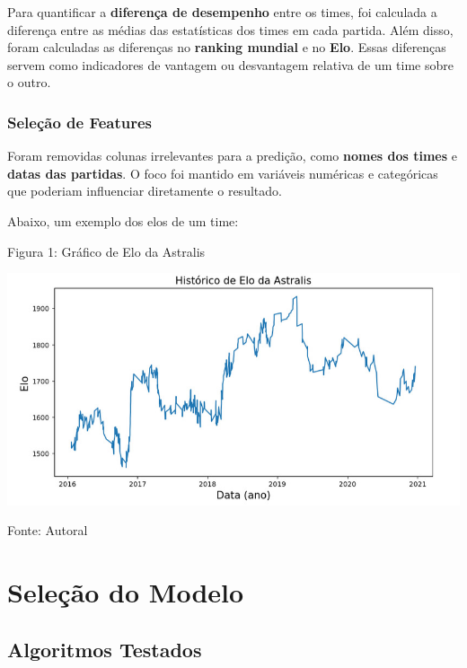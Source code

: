 \documentclass[a4paper,times,12pt]{article}
\begin{document}
\hspace{+15pt}
Para quantificar a \textbf{diferença de desempenho} entre os times, foi calculada a diferença entre as médias das estatísticas dos times em cada partida. Além disso, foram calculadas as diferenças no \textbf{ranking mundial} e no \textbf{Elo}. Essas diferenças servem como indicadores de vantagem ou desvantagem relativa de um time sobre o outro.

\subsubsection{Seleção de Features}

\hspace{+15pt}
Foram removidas colunas irrelevantes para a predição, como \textbf{nomes dos times} e \textbf{datas das partidas}. O foco foi mantido em variáveis numéricas e categóricas que poderiam influenciar diretamente o resultado.

Abaixo, um exemplo dos elos de um time:

\begin{center}
  \caption{Figura 1: Gráfico de Elo da Astralis}
  \centering
  \includegraphics[width=16cm]{grafico.jpeg}
  \label{fig:predicoes_cs_final}
  \caption{Fonte: Autoral}
\end{center}


\section{Seleção do Modelo}

\subsection{Algoritmos Testados}
\end{document}
